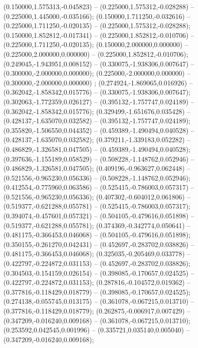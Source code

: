  (0.150000,1.575313,-0.045823) -- (0.225000,1.575312,-0.028288) -- (0.225000,1.445000,-0.035166);
 (0.150000,1.711250,-0.032616) -- (0.225000,1.711250,-0.020135) -- (0.225000,1.575312,-0.028288);
 (0.150000,1.852812,-0.017341) -- (0.225000,1.852812,-0.010706) -- (0.225000,1.711250,-0.020135);
 (0.150000,2.000000,0.000000) -- (0.225000,2.000000,0.000000) -- (0.225000,1.852812,-0.010706);
 (0.249045,-1.943951,0.008152) -- (0.330075,-1.938306,0.007647) -- (0.300000,-2.000000,0.000000);
 (0.225000,-2.000000,0.000000) -- (0.300000,-2.000000,0.000000) ;
 (0.274924,-1.869065,0.016926) -- (0.362042,-1.858342,0.015776) -- (0.330075,-1.938306,0.007647);
 (0.302063,-1.772359,0.026127) -- (0.395132,-1.757747,0.024189) -- (0.362042,-1.858342,0.015776);
 (0.329499,-1.651676,0.035428) -- (0.428137,-1.635070,0.032582) -- (0.395132,-1.757747,0.024189);
 (0.355820,-1.506550,0.044352) -- (0.459389,-1.490494,0.040528) -- (0.428137,-1.635070,0.032582);
 (0.379211,-1.339183,0.052282) -- (0.486829,-1.326581,0.047505) -- (0.459389,-1.490494,0.040528);
 (0.397636,-1.155189,0.058529) -- (0.508228,-1.148762,0.052946) -- (0.486829,-1.326581,0.047505);
 (0.409196,-0.963627,0.062448) -- (0.521556,-0.965230,0.056336) -- (0.508228,-1.148762,0.052946);
 (0.412554,-0.775960,0.063586) -- (0.525415,-0.786003,0.057317) -- (0.521556,-0.965230,0.056336);
 (0.407302,-0.604012,0.061806) -- (0.519377,-0.621288,0.055781) -- (0.525415,-0.786003,0.057317);
 (0.394074,-0.457601,0.057321) -- (0.504105,-0.479616,0.051898) -- (0.519377,-0.621288,0.055781);
 (0.374369,-0.342774,0.050641) -- (0.481175,-0.366453,0.046068) -- (0.504105,-0.479616,0.051898);
 (0.350155,-0.261270,0.042431) -- (0.452697,-0.283702,0.038826) -- (0.481175,-0.366453,0.046068);
 (0.325035,-0.205469,0.033778) -- (0.422797,-0.224872,0.031153) -- (0.452697,-0.283702,0.038826);
 (0.304503,-0.154159,0.026154) -- (0.398085,-0.170657,0.024525) -- (0.422797,-0.224872,0.031153);
 (0.287816,-0.104572,0.019362) -- (0.377816,-0.118429,0.018779) -- (0.398085,-0.170657,0.024525);
 (0.274138,-0.055745,0.013175) -- (0.361078,-0.067215,0.013710) -- (0.377816,-0.118429,0.018779);
 (0.262875,-0.006917,0.007429) -- (0.347209,-0.016240,0.009168) -- (0.361078,-0.067215,0.013710);
 (0.253592,0.042545,0.001996) -- (0.335721,0.035140,0.005040) -- (0.347209,-0.016240,0.009168);
